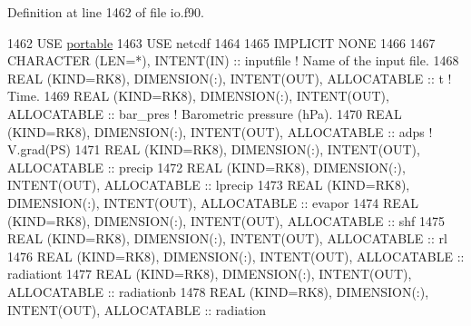 Definition at line 1462 of file io.\+f90.


\begin{DoxyCode}
1462     \textcolor{keywordtype}{USE }\hyperlink{namespaceportable}{portable}
1463     \textcolor{keywordtype}{USE }netcdf
1464 
1465     \textcolor{keywordtype}{IMPLICIT NONE}
1466 
1467     \textcolor{keywordtype}{CHARACTER (LEN=*)}, \textcolor{keywordtype}{INTENT(IN)}                                       :: inputfile    \textcolor{comment}{! Name of the input
       file.}
1468     \textcolor{keywordtype}{REAL (KIND=RK8)}, \textcolor{keywordtype}{DIMENSION(:)}, \textcolor{keywordtype}{INTENT(OUT)}, \textcolor{keywordtype}{ALLOCATABLE}             :: t            \textcolor{comment}{! Time.}
1469     \textcolor{keywordtype}{REAL (KIND=RK8)}, \textcolor{keywordtype}{DIMENSION(:)}, \textcolor{keywordtype}{INTENT(OUT)}, \textcolor{keywordtype}{ALLOCATABLE}             :: bar\_pres     \textcolor{comment}{! Barometric
       pressure (hPa).}
1470     \textcolor{keywordtype}{REAL (KIND=RK8)}, \textcolor{keywordtype}{DIMENSION(:)}, \textcolor{keywordtype}{INTENT(OUT)}, \textcolor{keywordtype}{ALLOCATABLE}             :: adps         \textcolor{comment}{! V.grad(PS)}
1471     \textcolor{keywordtype}{REAL (KIND=RK8)}, \textcolor{keywordtype}{DIMENSION(:)}, \textcolor{keywordtype}{INTENT(OUT)}, \textcolor{keywordtype}{ALLOCATABLE}             :: precip
1472     \textcolor{keywordtype}{REAL (KIND=RK8)}, \textcolor{keywordtype}{DIMENSION(:)}, \textcolor{keywordtype}{INTENT(OUT)}, \textcolor{keywordtype}{ALLOCATABLE}             :: lprecip
1473     \textcolor{keywordtype}{REAL (KIND=RK8)}, \textcolor{keywordtype}{DIMENSION(:)}, \textcolor{keywordtype}{INTENT(OUT)}, \textcolor{keywordtype}{ALLOCATABLE}             :: evapor
1474     \textcolor{keywordtype}{REAL (KIND=RK8)}, \textcolor{keywordtype}{DIMENSION(:)}, \textcolor{keywordtype}{INTENT(OUT)}, \textcolor{keywordtype}{ALLOCATABLE}             :: shf
1475     \textcolor{keywordtype}{REAL (KIND=RK8)}, \textcolor{keywordtype}{DIMENSION(:)}, \textcolor{keywordtype}{INTENT(OUT)}, \textcolor{keywordtype}{ALLOCATABLE}             :: rl
1476     \textcolor{keywordtype}{REAL (KIND=RK8)}, \textcolor{keywordtype}{DIMENSION(:)}, \textcolor{keywordtype}{INTENT(OUT)}, \textcolor{keywordtype}{ALLOCATABLE}             :: radiationt
1477     \textcolor{keywordtype}{REAL (KIND=RK8)}, \textcolor{keywordtype}{DIMENSION(:)}, \textcolor{keywordtype}{INTENT(OUT)}, \textcolor{keywordtype}{ALLOCATABLE}             :: radiationb
1478     \textcolor{keywordtype}{REAL (KIND=RK8)}, \textcolor{keywordtype}{DIMENSION(:)}, \textcolor{keywordtype}{INTENT(OUT)}, \textcolor{keywordtype}{ALLOCATABLE}             :: radiation

\end{DoxyCode}

